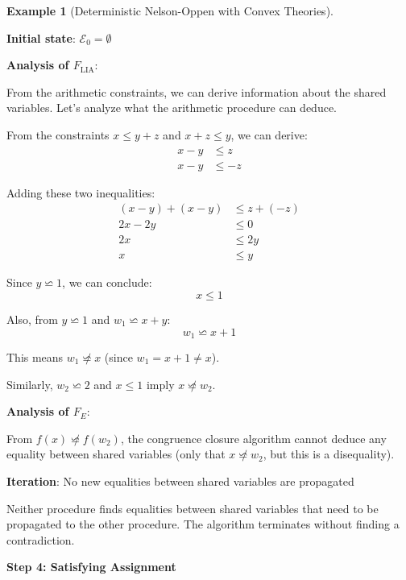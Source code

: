 \documentclass[11pt,a4paper]{article}
\theoremstyle{definition}
\newtheorem{example}{Example}[section]
\theoremstyle{plain}
\theoremstyle{remark}
\begin{document}
\begin{example}[Deterministic Nelson-Oppen with Convex Theories]
\begin{tcolorbox}[colback=blue!5!white,colframe=blue!75!black,title=\textbf{Example 1: Combining $\mathcal{T}_E$ and $\mathcal{T}_{\text{LIA}}$},breakable]
\textbf{Initial state}: $\mathcal{E}_0 = \emptyset$

\vspace{0.3em}

\textbf{Analysis of $F_{\text{LIA}}$}:

From the arithmetic constraints, we can derive information about the shared variables. Let's analyze what the arithmetic procedure can deduce.

From the constraints $x \leq y + z$ and $x + z \leq y$, we can derive:
\begin{align*}
x - y &\leq z \tag{from $x \leq y + z$} \\
x - y &\leq -z \tag{from $x + z \leq y$}
\end{align*}

Adding these two inequalities:
\begin{align*}
(x - y) + (x - y) &\leq z + (-z) \\
2x - 2y &\leq 0 \\
2x &\leq 2y \\
x &\leq y
\end{align*}

Since $y \backsimeq 1$, we can conclude:
\[
x \leq 1
\]

Also, from $y \backsimeq 1$ and $w_1 \backsimeq x + y$:
\[
w_1 \backsimeq x + 1
\]

This means $w_1 \not\backsimeq x$ (since $w_1 = x + 1 \neq x$).

Similarly, $w_2 \backsimeq 2$ and $x \leq 1$ imply $x \not\backsimeq w_2$.

\vspace{0.3em}

\textbf{Analysis of $F_E$}:

From $f(x) \not\backsimeq f(w_2)$, the congruence closure algorithm cannot deduce any equality between shared variables (only that $x \not\backsimeq w_2$, but this is a disequality).

\vspace{0.3em}

\textbf{Iteration}: No new equalities between shared variables are propagated

Neither procedure finds equalities between shared variables that need to be propagated to the other procedure. The algorithm terminates without finding a contradiction.

\vspace{0.5em}

\textbf{Step 4: Satisfying Assignment}


\end{tcolorbox}
\end{example}
\end{document}
